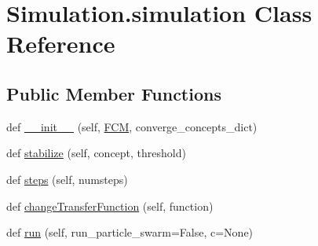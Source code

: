 \hypertarget{class_simulation_1_1simulation}{}\section{Simulation.\+simulation Class Reference}
\label{class_simulation_1_1simulation}
\subsection*{Public Member Functions}
\begin{DoxyCompactItemize}
\item 
def \hyperlink{class_simulation_1_1simulation_a0f0377da7ec6ea298232042744c03e89}{\+\_\+\+\_\+init\+\_\+\+\_\+} (self, \hyperlink{class_f_c_m_1_1_f_c_m}{F\+CM}, converge\+\_\+concepts\+\_\+dict)
\item 
def \hyperlink{class_simulation_1_1simulation_aba88676dbf04c07845b65cae2c85e536}{stabilize} (self, concept, threshold)
\item 
def \hyperlink{class_simulation_1_1simulation_ae4ffda917687b0cb3cd1582e15e7541d}{steps} (self, numsteps)
\item 
def \hyperlink{class_simulation_1_1simulation_a6de2037ab28f1fd076cadeb95f1e83fa}{change\+Transfer\+Function} (self, function)
\item 
def \hyperlink{class_simulation_1_1simulation_a2f32f5da01e7f1485510f5982be2860c}{run} (self, run\+\_\+particle\+\_\+swarm=False, c=None)
\end{DoxyCompactItemize}
